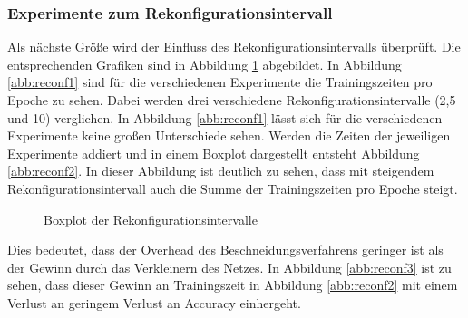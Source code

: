 \subsubsection{Experimente zum Rekonfigurationsintervall}

 Als nächste Größe wird der Einfluss des Rekonfigurationsintervalls überprüft. Die entsprechenden Grafiken sind in Abbildung \ref{abb:reconf} abgebildet. In Abbildung \ref{abb:reconf1} sind für die verschiedenen Experimente die Trainingszeiten pro Epoche zu sehen. Dabei werden drei verschiedene Rekonfigurationsintervalle (2,5 und 10) verglichen. In Abbildung \ref{abb:reconf1} lässt sich für die verschiedenen Experimente keine großen Unterschiede sehen. Werden die Zeiten der jeweiligen Experimente addiert und in einem Boxplot dargestellt entsteht Abbildung \ref{abb:reconf2}. In dieser Abbildung ist deutlich zu sehen, dass mit steigendem Rekonfigurationsintervall auch die Summe der Trainingszeiten pro Epoche steigt.
 
 \begin{figure}[h]
 \centering
 \qquad
 \caption{Boxplot der Rekonfigurationsintervalle}
 \label{abb:reconf}
\end{figure}

 Dies bedeutet, dass der Overhead des Beschneidungsverfahrens geringer ist als der Gewinn durch das Verkleinern des Netzes. In Abbildung \ref{abb:reconf3} ist zu sehen, dass dieser Gewinn an Trainingszeit in Abbildung \ref{abb:reconf2} mit einem Verlust an geringem Verlust an Accuracy einhergeht.  

